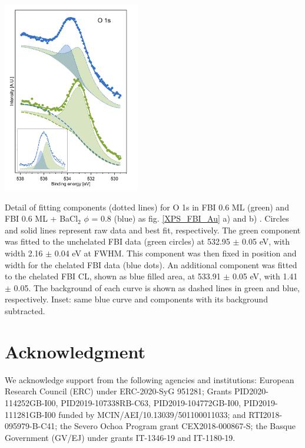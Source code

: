 \documentclass[aps,prl,reprint,longbibliography,superscriptaddress, english]{revtex4-1}
\begin{document}
\begin{center}
	\includegraphics[width=0.45\textwidth]{figures/fig6_fit.pdf}
	\captionsetup{type=figure} %
	\caption{\label{XPS_fits} Detail of fitting components (dotted lines) for O 1s in FBI 0.6 ML (green) and FBI 0.6 ML + BaCl$_2$ $\phi$ = 0.8 (blue) as fig. \ref{XPS_FBI_Au} a) and b) . Circles and solid lines represent raw data and best fit, respectively. The green component was fitted to the unchelated FBI data (green circles) at 532.95 $\pm$ 0.05 eV, with width 2.16 $\pm$ 0.04 eV at FWHM. This component was then fixed in position and width for the chelated FBI data (blue dots). An additional component was fitted to the chelated FBI CL, shown as blue filled area, at 533.91 $\pm$ 0.05 eV,  with 1.41 $\pm$ 0.05. The background of each curve is shown as dashed lines in green and blue, respectively. Inset: same blue curve and components with its background subtracted.}
\end{center}


\section{Acknowledgment}
We acknowledge support from the following agencies and institutions: European Research Council (ERC) under ERC-2020-SyG 951281; Grants PID2020-114252GB-I00, PID2019-107338RB-C63, PID2019-104772GB-I00, PID2019-111281GB-I00 funded by MCIN/AEI/10.13039/501100011033; and RTI2018-095979-B-C41; the Severo Ochoa Program grant CEX2018-000867-S; the Basque Government (GV/EJ) under grants IT-1346-19 and IT-1180-19. 
\end{document}
